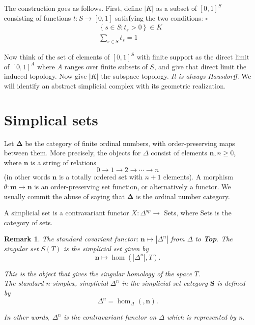 \documentclass{book}
\newtheorem{rema}{Remark}
\begin{document}
The construction goes as follows. First, define $|K|$ as a subset of $[0,1]^S$ consisting of functions $t: S \rightarrow[0,1]$ satisfying the two conditions: $\square$
$$
\begin{aligned}
& \left\{s \in S: t_s>0\right\} \in K \\
& \sum_{s \in S} t_s=1
\end{aligned}
$$

Now think of the set of elements of $[0,1]^S$ with finite support as the direct limit of $[0,1]^A$ where $A$ ranges over finite subsets of $S$, and give that direct limit the induced topology. Now give $|K|$ the subspace topology. \textit{It is always Hausdorff}. We will identify an abstract simplicial complex with its geometric realization.





\section{Simplical sets}



Let $\mathbf{\Delta}$ be the category of finite ordinal numbers, with order-preserving maps between them. More precisely, the objects for $\Delta$ consist of elements $\mathbf{n}, n \geq 0$, where $\mathbf{n}$ is a string of relations
$$
0 \rightarrow 1 \rightarrow 2 \rightarrow \cdots \rightarrow n
$$
(in other words $\mathbf{n}$ is a totally ordered set with $n+1$ elements). A morphism $\theta: \mathbf{m} \rightarrow \mathbf{n}$ is an order-preserving set function, or alternatively a functor. We usually commit the abuse of saying that $\mathbf{\Delta}$ is the ordinal number category.

A simplicial set is a contravariant functor $X: \Delta^{o p} \rightarrow$ Sets, where Sets is the category of sets.

\begin{rema}
    The standard covariant functor: $\mathbf{n} \mapsto |\Delta^n| $ from $\Delta$ to \textbf{Top}. The singular set $S(T)$ is the simplicial set given by
    $$
    \mathbf{n} \mapsto \operatorname{hom}\left(\left|\Delta^n\right|, T\right) .
    $$
    
    This is the object that gives the singular homology of the space $T$.\\

    The standard $n$-simplex, simplicial $\Delta^n$ in the simplicial set category $\mathbf{S}$ is defined by
$$
\Delta^n=\operatorname{hom}_{\Delta}(, \mathbf{n}) .
$$

In other words, $\Delta^n$ is the contravariant functor on $\Delta$ which is represented by n.
\end{rema}
\end{document}
